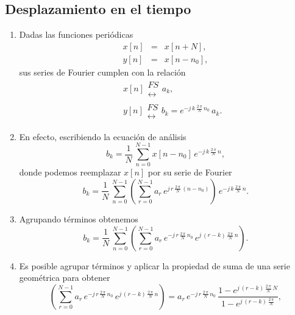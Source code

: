 \subsection{Desplazamiento en el tiempo}

\begin{enumerate}

\item Dadas las funciones peri\'{o}dicas
\begin{eqnarray}
x\left[ n\right] &=&x\left[ n+N\right] , \\
y\left[ n\right] &=&x\left[ n-n_{0}\right] ,
\end{eqnarray}
sus series de Fourier cumplen con la relaci\'{o}n
\begin{eqnarray}
&&x\left[ n\right] 
\begin{array}{l}
FS \\ 
\longleftrightarrow
\end{array}
a_{k}, \\
&&y\left[ n\right] 
\begin{array}{l}
FS \\ 
\longleftrightarrow
\end{array}
b_{k}=e^{-j \, k \, \frac{2 \, \pi }{N} \, n_{0}} \, a_{k}.
\end{eqnarray}

\item En efecto, escribiendo la ecuaci\'{o}n de an\'{a}lisis
\begin{equation}
b_{k}=
\frac{1}{N} \, \sum_{n=0}^{N-1}x\left[ n-n_{0}\right] \, e^{-j \, k \, \frac{2 \, \pi }{N} \, n},
\end{equation}
donde podemos reemplazar $x[n]$ por su serie de Fourier
\begin{equation}
b_{k}=
\frac{1}{N} \, \sum_{n=0}^{N-1}
\left( \sum_{r=0}^{N-1}a_{r} \, e^{j \, r \, \frac{2 \, \pi}{N} \, \left( n-n_{0}\right) }
\right) \, e^{-j \, k \, \frac{2 \, \pi }{N} \, n}.
\end{equation}

\item Agrupando t\'{e}rminos obtenemos
\begin{equation}
b_{k}=
\frac{1}{N} \, \sum_{n=0}^{N-1}
\left( 
  \sum_{r=0}^{N-1}
  a_{r} \, e^{-j \, r \, \frac{2 \, \pi }{N} \, n_{0}}
  \, e^{j \, \left( r-k\right) \, \frac{2 \, \pi}{N} \, n}
\right).
\end{equation}

\item Es posible agrupar t\'{e}rminos y aplicar la propiedad de suma
  de una serie geom\'{e}trica para obtener
\begin{equation}
\left( \sum_{r=0}^{N-1}
a_{r} \, e^{-j \, r \, \frac{2 \, \pi }{N} \, n_{0}} \, e^{j \, \left( r-k\right) \, \frac{2 \, \pi }{N} \, n}
\right) =
a_{r} \, e^{-j \, r \, \frac{2 \, \pi }{N} \, n_{0}} \, 
\frac{1-e^{j \, \left( r-k\right) \, \frac{2 \, \pi }{N} \, N}}{1-e^{j \, \left( r-k\right) \, \frac{2 \, \pi }{N}}},
\end{equation}


\end{enumerate}
